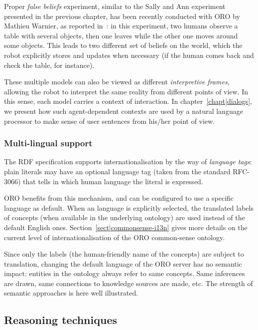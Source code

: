 Proper \emph{false beliefs} experiment, similar to the Sally and Ann experiment
presented in the previous chapter, has been recently conducted with ORO
by Mathieu Warnier, as reported in~\cite{Warnier2012a}: in this experiment, two
humans observe a table with several objects, then one leaves while the other
one moves around some objects. This leads to two different set of beliefs on
the world, which the robot explicitly stores and updates when necessary (if the
human comes back and check the table, for instance).

These multiple models can also be viewed as different \emph{interpretive
frames}, allowing the robot to interpret the same reality from different points
of view. In this sense, each model carries a context of interaction.  In
chapter~\ref{chapt|dialogs}, we present how such agent-dependent contexts are
used by a natural language processor to make sense of user sentences from
his/her point of view.

\subsubsection{Multi-lingual support}
\label{sect|multilingual}

The RDF specification supports internationalisation by the way of
\emph{language tags}: plain literals may have an optional language tag (taken
from the standard RFC-3066) that tells in which human language the literal is
expressed.

ORO benefits from this mechanism, and can be configured to use a specific
language as default. When an language is explicitly selected, the translated
labels of concepts (when available in the underlying ontology) are used instead
of the default English ones. Section~\ref{sect|commonsense-i13n} gives more
details on the current level of internationalisation of the ORO common-sense
ontology.

Since only the labels (\ie the human-friendly name of the concepts) are subject
to translation, changing the default language of the ORO server has no semantic
impact: entities in the ontology always refer to same concepts. Same inferences
are drawn, same connections to knowledge sources are made, etc. The strength of
semantic approaches is here well illustrated.

\subsection{Reasoning techniques}

